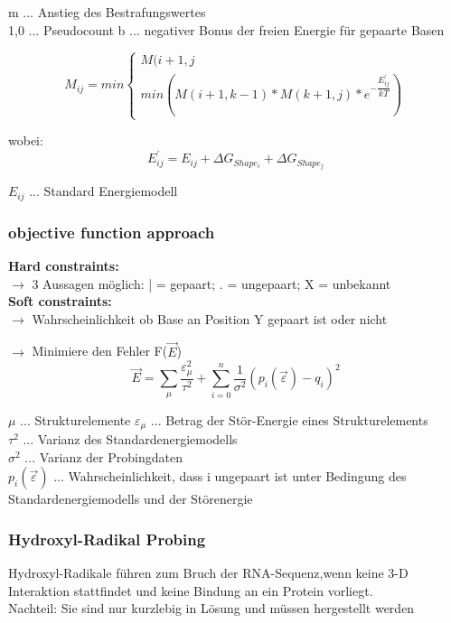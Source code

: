 m ... Anstieg des Bestrafungswertes \\
1,0 ... Pseudocount
b ... negativer Bonus der freien Energie für gepaarte Basen

\begin{equation}
M_{ij} = min
\begin{cases} 
M(i+1,j \\
min (M(i+1,k-1)*M(k+1,j)*e^{-\dfrac{E^{'}_{ij}}{kT}})
\end{cases}
\end{equation}

wobei:
\begin{equation}
E^{'}_{ij} = E_{ij} + \Delta G_{Shape_i} + \Delta G_{Shape_j}
\end{equation}

$E_{ij}$ ... Standard Energiemodell

\subsubsection{objective function approach}
\textbf{Hard constraints:} \\
$\rightarrow$ 3 Aussagen möglich: | = gepaart; . = ungepaart; X = unbekannt \\
\textbf{Soft constraints:} \\ 
$\rightarrow$ Wahrscheinlichkeit ob Base an Position Y gepaart ist oder nicht 

$\rightarrow$ Minimiere den Fehler F($\vec{E}$) \\
\begin{equation}
\vec{E} = \sum_{\mu} \dfrac{\varepsilon_{\mu}^{2}}{\tau^2} + \sum_{i = 0}^{n} \dfrac{1}{\sigma^2}(p_i(\vec{\varepsilon}) -q_i)^2
\end{equation} 

$\mu$ ... Strukturelemente
$\varepsilon_{\mu}$ ... Betrag der Stör-Energie eines Strukturelements\\
$\tau^2$ ... Varianz des Standardenergiemodells \\
$\sigma^2$ ... Varianz der Probingdaten \\
$p_i(\vec{\varepsilon})$ ... Wahrscheinlichkeit, dass i ungepaart ist unter Bedingung des Standardenergiemodells und der Störenergie

\subsubsection{Hydroxyl-Radikal Probing}
Hydroxyl-Radikale führen zum Bruch der RNA-Sequenz,wenn keine 3-D Interaktion stattfindet und keine Bindung an ein Protein vorliegt.\\
Nachteil: Sie sind nur kurzlebig in Lösung und müssen hergestellt werden

